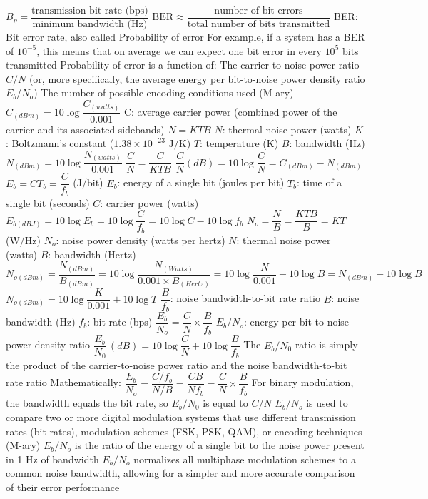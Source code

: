 \documentclass[openany]{book}
\begin{document}
\begin{outline}
	\1 $B_{\eta} = \dfrac{\text{transmission bit rate (bps)}}{\text{minimum bandwidth (Hz)}}$
	\1 $\text{BER} \approx \dfrac{\text{number of bit errors}}{\text{total number of bits transmitted}}$
	\2 BER: Bit error rate, also called Probability of error
	\2 For example, if a system has a BER of $10^{-5}$, this means that on average we can expect one bit error in every $10^5$ bits transmitted
	\2 Probability of error is a function of:
	\3 The carrier-to-noise power ratio $C/N$ (or, more specifically, the average energy per bit-to-noise power density ratio $E_b/N_o$)
	\3 The number of possible encoding conditions used (M-ary)
	\1 $C_{(dBm)} = 10 \log \dfrac{C_{(watts)}}{0.001}$
	\2 C: average carrier power (combined power of the carrier and its associated sidebands)
	\1 $N = KTB$
	\2 $N$: thermal noise power (watts)
	\2 $K$: Boltzmann's constant ($1.38 \times 10^{-23} \text{ J/K}$)
	\2 $T$: temperature (K)
	\2 $B$: bandwidth (Hz)
	\2 $N_{(dBm)} = 10 \log \dfrac{N_{(watts)}}{0.001}$
	\1 $\dfrac{C}{N} = \dfrac{C}{KTB}$
	\2 $\dfrac{C}{N} (dB) = 10 \log \dfrac{C}{N} = C_{(dBm)} - N_{(dBm)}$
	\1 $E_b = C T_b= \dfrac{C}{f_b}$ (J/bit)
	\2 $E_b$: energy of a single bit (joules per bit)
	\2 $T_b$: time of a single bit (seconds)
	\2 $C$: carrier power (watts)
	\2 $E_{b(dBJ)} = 10 \log E_b = 10 \log \dfrac{C}{f_b} = 10 \log C - 10 \log f_b$
	\1 $N_o = \dfrac{N}{B} = \dfrac{KTB}{B} = KT$ (W/Hz)
	\2 $N_o$: noise power density (watts per hertz)
	\2 $N$: thermal noise power (watts)
	\2 $B$: bandwidth (Hertz)
	\2 $N_{o(dBm)} = \dfrac{N_{(dBm)}}{B_{(dBm)}} = 10 \log \dfrac{N_{(Watts)}}{0.001 \times B_{(Hertz)}} = 10 \log \dfrac{N}{0.001} - 10 \log B = N_{(dBm)} - 10 \log B$
	\2 $N_{o(dBm)} = 10 \log \dfrac{K}{0.001} + 10 \log T$
	\1 $\dfrac{B}{f_b}$: noise bandwidth-to-bit rate ratio
	\2 $B$: noise bandwidth (Hz)
	\2 $f_b$: bit rate (bps)
	\1 $\dfrac{E_b}{N_o} = \dfrac{C}{N} \times \dfrac{B}{f_b}$
	\2 $E_b/N_o$: energy per bit-to-noise power density ratio
	\2 $\dfrac{E_b}{N_0} \, (dB) = 10 \log \dfrac{C}{N} + 10 \log \dfrac{B}{f_b}$
	\2 The $E_b/N_0$ ratio is simply the product of the carrier-to-noise power ratio and the noise bandwidth-to-bit rate ratio
	\2 Mathematically: $\dfrac{E_b}{N_o} = \dfrac{C/f_b}{N/B} = \dfrac{CB}{Nf_b} = \dfrac{C}{N} \times \dfrac{B}{f_b}$
	\2 For binary modulation, the bandwidth equals the bit rate, so $E_b/N_0$ is equal to $C/N$
	\2 $E_b/N_o$ is used to compare two or more digital modulation systems that use different transmission rates (bit rates), modulation schemes (FSK, PSK, QAM), or encoding techniques (M-ary)
	\2 $E_b/N_o$ is the ratio of the energy of a single bit to the noise power present in 1 Hz of bandwidth
	\2 $E_b/N_o$ normalizes all multiphase modulation schemes to a common noise bandwidth, allowing for a simpler and more accurate comparison of their error performance
\end{outline}
\end{document}
